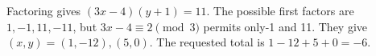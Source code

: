 Factoring gives $(3x-4)(y+1)=11$. The possible first factors are $1,-1,11,-11$, but $3x-4\equiv2\pmod3$ permits only-1 and 11. They give $(x,y)=(1,-12),(5,0)$. The requested total is $1-12+5+0=\boxed{-6}$.

